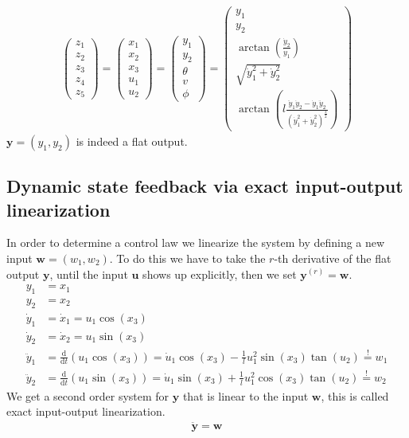 \documentclass[a4paper,11pt,headings=standardclasses,parskip=half]{scrartcl}
\renewcommand{\d}{\mathrm{d}} %
\newcommand{\uu}{\mathbf{u}}
\newcommand{\y}{\mathbf{y}}
\begin{document}
\begin{align}
\begin{pmatrix} z_1 \\ z_2 \\ z_3 \\ z_4 \\ z_5 \end{pmatrix} = 
\begin{pmatrix} x_1 \\ x_2 \\ x_3 \\ u_1 \\ u_2 \end{pmatrix} = 
\begin{pmatrix} y_1 \\ y_2 \\ \theta \\v \\  \phi \end{pmatrix} =
\begin{pmatrix} y_1 \\ y_2 \\  \arctan\left(\frac{\dot{y}_2}{\dot{y}_1}\right)\\ \sqrt{\dot{y}_1^2+\dot{y}_2^2}\\ \arctan\left(l \frac{\ddot{y}_1 \dot{y}_2 - \dot{y}_1 \ddot{y}_2}{(\dot{y}_1^2+\dot{y}_2^2)^{\frac{3}{2}}} 
\right) \end{pmatrix}
\end{align}
$\y = (y_1, y_2)$ is indeed a flat output.
\subsection{Dynamic state feedback via exact input-output linearization}
In order to determine a control law we linearize the system by defining a new input $\mathbf{w}=(w_1,w_2)$. To do this we have to take the $r$-th derivative of the flat output $\y$, until the input $\uu$ shows up explicitly, then we set $\y^{(r)}=\mathbf{w}$.
\begin{subequations}
\begin{align}
y_1 &= x_1 \\
y_2 &= x_2 \\
\dot{y}_1 &= \dot{x}_1 = u_1 \cos(x_3)\\
\dot{y}_2 &= \dot{x}_2 = u_1 \sin(x_3) \\
\ddot{y}_1 &= \frac{\d}{\d t}(u_1 \cos(x_3)) = \dot{u}_1 \cos(x_3) - \frac{1}{l}u_1^2\sin(x_3)\tan(u_2) \overset{!}{=} w_1 \label{eq:7e} \\
\ddot{y}_2 &= \frac{\d}{\d t}(u_1 \sin(x_3)) = \dot{u}_1 \sin(x_3) + \frac{1}{l}u_1^2\cos(x_3)\tan(u_2) \overset{!}{=} w_2  \label{eq:7f}
\end{align}
\end{subequations}
We get a second order system for $\y$ that is linear to the input $\mathbf{w}$, this is called exact input-output linearization.
\begin{align}
\label{eq:8}
\ddot{\y} = \mathbf{w}
\end{align}
\end{document}

